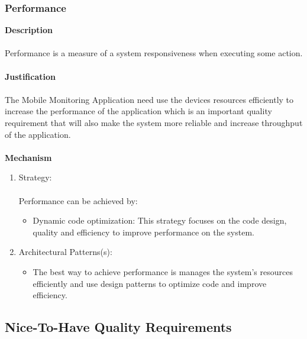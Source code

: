 \documentclass[hidelinks, 12pt, oneside]{article}
\begin{document}
			\subsubsection{Performance}
			\textbf{Description}\\\\
			Performance is a measure of a system responsiveness when executing some action.\\\\
			\textbf{Justification}\\\\
			The Mobile Monitoring Application need use the devices resources efficiently to increase the performance of the application which is an important quality requirement that will also make the system more reliable and increase throughput of the application.\\\\
			\textbf{Mechanism}
			\begin{enumerate}
				\item Strategy:\\\\
				Performance can be achieved by:
				\begin{itemize}
				\item Dynamic code optimization: This strategy focuses on the code design, quality and efficiency to improve performance on the system.  
				\end{itemize}
				\item Architectural Patterns(s):
				\begin{itemize}
				\item The best way to achieve performance is manages the system's resources efficiently and use design patterns to optimize code and improve efficiency.   
				\end{itemize}
			\end{enumerate}	
			
		\newpage
		\subsection{Nice-To-Have Quality Requirements}
\end{document}
